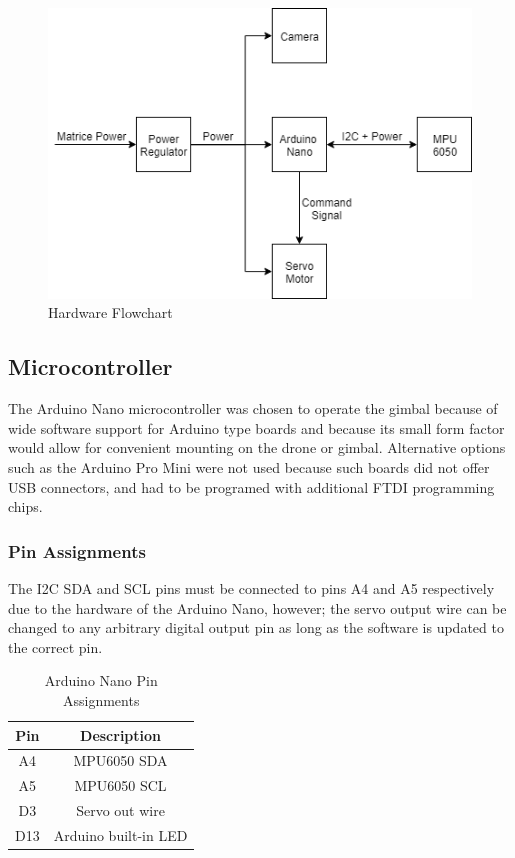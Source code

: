 \documentclass[11pt]{article} %
\begin{document}
\begin{figure}[H]
\begin{centering}
\includegraphics[height = 0.5\textwidth]{Pictures/hardware_flowchart.png}
\caption{Hardware Flowchart}
\label{fig:hardware}
\end{centering}
\end{figure}

\subsection{Microcontroller}
The Arduino Nano microcontroller was chosen to operate the gimbal because of wide software support for Arduino type boards and because its small form factor would allow for convenient mounting on the drone or gimbal. Alternative options such as the Arduino Pro Mini were not used because such boards did not offer USB connectors, and had to be programed with additional FTDI programming chips. 

\subsubsection{Pin Assignments}
The I2C SDA and SCL pins must be connected to pins A4 and A5 respectively due to the hardware of the Arduino Nano, however; the servo output wire can be changed to any arbitrary digital output pin as long as the software is updated to the correct pin.
\begin{table}[H]
	\begin{center}
		\caption{Arduino Nano Pin Assignments}
		\label{tab:nano_pins}
		\begin{tabular}[l]{|c|c|}
			\hline
			\textbf{Pin} & \textbf{Description} \\ \hline \hline
			A4 & MPU6050 SDA  \\ \hline
			A5 & MPU6050 SCL   \\ \hline
			D3 & Servo out wire  \\ \hline
			D13 & Arduino built-in LED \\ \hline
			
		\end{tabular}
		
	\end{center}
\end{table}
\end{document}
